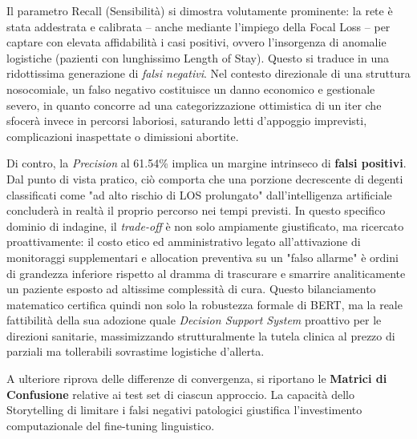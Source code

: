 Il parametro Recall (Sensibilità) si dimostra volutamente prominente: la rete è stata addestrata e calibrata -- anche mediante l'impiego della Focal Loss -- per captare con elevata affidabilità i casi positivi, ovvero l'insorgenza di anomalie logistiche (pazienti con lunghissimo Length of Stay). Questo si traduce in una ridottissima generazione di \textit{falsi negativi}. Nel contesto direzionale di una struttura nosocomiale, un falso negativo costituisce un danno economico e gestionale severo, in quanto concorre ad una categorizzazione ottimistica di un iter che sfocerà invece in percorsi laboriosi, saturando letti d'appoggio imprevisti, complicazioni inaspettate o dimissioni abortite.

Di contro, la \textit{Precision} al 61.54\% implica un margine intrinseco di \textbf{falsi positivi}. Dal punto di vista pratico, ciò comporta che una porzione decrescente di degenti classificati come "ad alto rischio di LOS prolungato" dall'intelligenza artificiale concluderà in realtà il proprio percorso nei tempi previsti. In questo specifico dominio di indagine, il \textit{trade-off} è non solo ampiamente giustificato, ma ricercato proattivamente: il costo etico ed amministrativo legato all'attivazione di monitoraggi supplementari e allocation preventiva su un "falso allarme" è ordini di grandezza inferiore rispetto al dramma di trascurare e smarrire analiticamente un paziente esposto ad altissime complessità di cura. Questo bilanciamento matematico certifica quindi non solo la robustezza formale di BERT, ma la reale fattibilità della sua adozione quale \textit{Decision Support System} proattivo per le direzioni sanitarie, massimizzando strutturalmente la tutela clinica al prezzo di parziali ma tollerabili sovrastime logistiche d'allerta.

A ulteriore riprova delle differenze di convergenza, si riportano le \textbf{Matrici di Confusione} relative ai test set di ciascun approccio. La capacità dello Storytelling di limitare i falsi negativi patologici giustifica l'investimento computazionale del fine-tuning linguistico.

